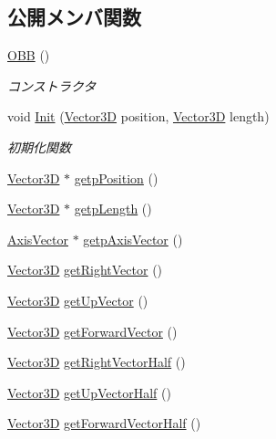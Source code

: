 \subsection*{公開メンバ関数}
\begin{DoxyCompactItemize}
\item 
\mbox{\hyperlink{class_o_b_b_af752af068c6fc1787f06556b6a71c929}{O\+BB}} ()
\begin{DoxyCompactList}\small\item\em コンストラクタ \end{DoxyCompactList}\item 
void \mbox{\hyperlink{class_o_b_b_ae5d7ba6a226b2da4271ffd16d478d800}{Init}} (\mbox{\hyperlink{class_vector3_d}{Vector3D}} position, \mbox{\hyperlink{class_vector3_d}{Vector3D}} length)
\begin{DoxyCompactList}\small\item\em 初期化関数 \end{DoxyCompactList}\item 
\mbox{\hyperlink{class_vector3_d}{Vector3D}} $\ast$ \mbox{\hyperlink{class_o_b_b_a72d5af1f3234560445244447da2150e1}{getp\+Position}} ()
\item 
\mbox{\hyperlink{class_vector3_d}{Vector3D}} $\ast$ \mbox{\hyperlink{class_o_b_b_a6bdba6c807846b5eb1a3842981089479}{getp\+Length}} ()
\item 
\mbox{\hyperlink{class_axis_vector}{Axis\+Vector}} $\ast$ \mbox{\hyperlink{class_o_b_b_aa79d651cda6be3bb1c9456566027f8f9}{getp\+Axis\+Vector}} ()
\item 
\mbox{\hyperlink{class_vector3_d}{Vector3D}} \mbox{\hyperlink{class_o_b_b_a7879aad21978ea9dfc5f50a608349b27}{get\+Right\+Vector}} ()
\item 
\mbox{\hyperlink{class_vector3_d}{Vector3D}} \mbox{\hyperlink{class_o_b_b_a73da06fa4dbebb2b59dc3168971c8d5d}{get\+Up\+Vector}} ()
\item 
\mbox{\hyperlink{class_vector3_d}{Vector3D}} \mbox{\hyperlink{class_o_b_b_a4d839b676caebf6ba4361bb9166e97d3}{get\+Forward\+Vector}} ()
\item 
\mbox{\hyperlink{class_vector3_d}{Vector3D}} \mbox{\hyperlink{class_o_b_b_ab0452e841ab2c1362b2e6365b27cea97}{get\+Right\+Vector\+Half}} ()
\item 
\mbox{\hyperlink{class_vector3_d}{Vector3D}} \mbox{\hyperlink{class_o_b_b_a510542bc5071eb9bd174d69ffa64f023}{get\+Up\+Vector\+Half}} ()
\item 
\mbox{\hyperlink{class_vector3_d}{Vector3D}} \mbox{\hyperlink{class_o_b_b_a00b6038bdcc374d3acd9ef4d002b59d0}{get\+Forward\+Vector\+Half}} ()
\end{DoxyCompactItemize}
